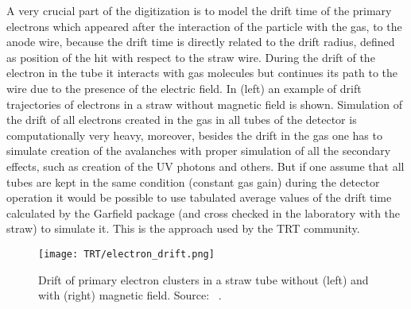 A very crucial part of the digitization is to model the drift time of the primary electrons which appeared after the interaction of the particle with the gas, to the anode wire, because the drift time is directly related to the drift radius, defined as position of the hit with respect to the straw wire.
During the drift of the electron in the tube it interacts with gas molecules but continues its path to the wire due to the presence of the electric field.
In  (left) an example of drift trajectories of electrons in a straw without magnetic field is shown.
Simulation of the drift of all electrons created in the gas in all tubes of the detector is computationally very heavy,
moreover, besides the drift in the gas one has to simulate creation of the avalanches with proper simulation of all the secondary effects,
such as creation of the UV photons and others. But if one assume that all tubes are kept in the same condition (constant gas gain) during the detector operation it would
be possible to use tabulated average values of the drift time calculated by the Garfield package (and cross checked in the laboratory with the straw) to simulate it.
This is the approach used by the TRT community. 

\begin{figure}
\begin{center}
 \texttt{[image: TRT/electron\_drift.png]}
\caption {Drift of primary electron clusters in a straw tube without (left) and with (right) magnetic field. Source: ~\cite{cwetanski_thesis}. 
}
\label{fig:clusterDriftInTube}
\end{center}
\end{figure}

